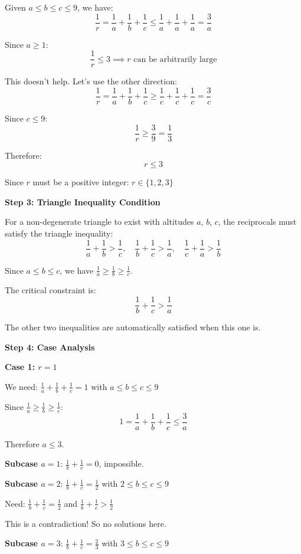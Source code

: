 \documentclass[12pt]{article}
\begin{document}
\begin{solutionbox}
Given $a \leq b \leq c \leq 9$, we have:
$$\frac{1}{r} = \frac{1}{a} + \frac{1}{b} + \frac{1}{c} \leq \frac{1}{a} + \frac{1}{a} + \frac{1}{a} = \frac{3}{a}$$

Since $a \geq 1$:
$$\frac{1}{r} \leq 3 \implies r \text{ can be arbitrarily large}$$

This doesn't help. Let's use the other direction:
$$\frac{1}{r} = \frac{1}{a} + \frac{1}{b} + \frac{1}{c} \geq \frac{1}{c} + \frac{1}{c} + \frac{1}{c} = \frac{3}{c}$$

Since $c \leq 9$:
$$\frac{1}{r} \geq \frac{3}{9} = \frac{1}{3}$$

Therefore:
$$r \leq 3$$

Since $r$ must be a positive integer: $\boxed{r \in \{1, 2, 3\}}$

\textbf{Step 3: Triangle Inequality Condition}

For a non-degenerate triangle to exist with altitudes $a$, $b$, $c$, the reciprocals must satisfy the triangle inequality:
$$\frac{1}{a} + \frac{1}{b} > \frac{1}{c}, \quad \frac{1}{b} + \frac{1}{c} > \frac{1}{a}, \quad \frac{1}{c} + \frac{1}{a} > \frac{1}{b}$$

Since $a \leq b \leq c$, we have $\frac{1}{a} \geq \frac{1}{b} \geq \frac{1}{c}$. 

The critical constraint is:
$$\boxed{\frac{1}{b} + \frac{1}{c} > \frac{1}{a}}$$

The other two inequalities are automatically satisfied when this one is.

\textbf{Step 4: Case Analysis}

\textbf{Case 1: $r = 1$}

We need: $\frac{1}{a} + \frac{1}{b} + \frac{1}{c} = 1$ with $a \leq b \leq c \leq 9$

Since $\frac{1}{a} \geq \frac{1}{b} \geq \frac{1}{c}$:
$$1 = \frac{1}{a} + \frac{1}{b} + \frac{1}{c} \leq \frac{3}{a}$$

Therefore $a \leq 3$.

\textbf{Subcase $a = 1$}: $\frac{1}{b} + \frac{1}{c} = 0$, impossible.

\textbf{Subcase $a = 2$}: $\frac{1}{b} + \frac{1}{c} = \frac{1}{2}$ with $2 \leq b \leq c \leq 9$

Need: $\frac{1}{b} + \frac{1}{c} = \frac{1}{2}$ and $\frac{1}{b} + \frac{1}{c} > \frac{1}{2}$

This is a contradiction! So no solutions here.

\textbf{Subcase $a = 3$}: $\frac{1}{b} + \frac{1}{c} = \frac{2}{3}$ with $3 \leq b \leq c \leq 9$


\end{solutionbox}
\end{document}
